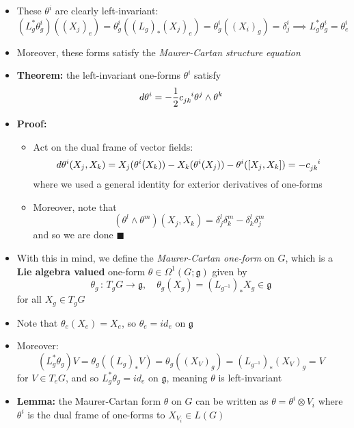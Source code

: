 \documentclass[12pt,a4paper]{article}
\numberwithin{equation}{section}
\begin{document}
\begin{itemize}
		\item These $\theta^{i}$ are clearly left-invariant:
		\begin{equation}
			(L_{g}^{*}\theta_{g}^{i})((X_{j})_{e})=\theta_{g}^{i}((L_{g})_{*}(X_{j})_{e})=\theta^{i}_{g}((X_{i})_{g})=\delta^{i}_{j}\implies L_{g}^{*}\theta_{g}^{i}=\theta_{e}^{i}
		\end{equation}
		\item Moreover, these forms satisfy the \textit{Maurer-Cartan structure equation}
		\item \textbf{Theorem:} the left-invariant one-forms $\theta^{i}$ satisfy
		\begin{equation}
			d\theta^{i}=-\frac{1}{2}c\indices{_j_k^i}\theta^{j}\wedge\theta^{k}
		\end{equation}
		\item \textbf{Proof:}
		\begin{itemize}
			\item Act on the dual frame of vector fields:
			$$
			\begin{aligned}
				d\theta^{i}(X_{j},X_{k})=X_{j}(\theta^{i}(X_{k}))-X_{k}(\theta^{i}(X_{j}))-\theta^{i}([X_{j},X_{k}])=-c\indices{_j_k^i}
			\end{aligned}
			$$
			where we used a general identity for exterior derivatives of one-forms
			\item Moreover, note that
			$$
			(\theta^{l}\wedge\theta^{m})(X_{j},X_{k})=\delta_{j}^{l}\delta_{k}^{m}-\delta_{k}^{l}\delta_{j}^{m}
			$$
			and so we are done $\blacksquare$
		\end{itemize}
		\item With this in mind, we define the \textit{Maurer-Cartan one-form} on $G$, which is a \textbf{Lie algebra valued} one-form $\theta\in \Omega^{1}(G;\mathfrak{g})$ given by
		\begin{equation}
			\theta_{g}\,:\,T_{g}G\to \mathfrak{g},\quad \theta_{g}(X_{g})=(L_{g^{-1}})_{*}X_{g}\in\mathfrak{g}
		\end{equation}
		for all $X_{g}\in T_{g}G$
		\item Note that $\theta_{e}(X_{e})=X_{e}$, so $\theta_{e}=id_{e}$ on $\mathfrak{g}$
		\item Moreover:
		$$
		(L_{g}^{*}\theta_{g})V=\theta_{g}((L_{g})_{*}V)=\theta_{g}((X_{V})_{g})=(L_{g^{-1}})_{*}(X_{V})_{g}=V
		$$
		for $V\in T_{e}G$, and so $L_{g}^{*}\theta_{g}=id_{e}$ on $\mathfrak{g}$, meaning $\theta$ is left-invariant
		\item \textbf{Lemma:} the Maurer-Cartan form $\theta$ on $G$ can be written as $\theta=\theta^{i}\otimes V_{i}$ where $\theta^{i}$ is the dual frame of one-forms to $X_{V_{i}}\in L(G)$

\end{itemize}
\end{document}
